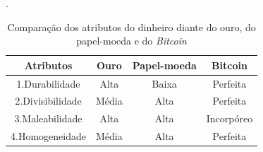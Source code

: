 \FloatBarrier
\begin{table}[h]
    \centering
	\caption{Comparação dos atributos do dinheiro diante do ouro, do papel-moeda e do \textit{Bitcoin}}.
	\begin{tabular}{|c|c|c|c|}
        
		\hline
		\rowcolor[HTML]{C0C0C0}
		\textbf{Atributos}                                                                & \textbf{Ouro}                                                     & \textbf{Papel-moeda}                                                              & \textbf{Bitcoin}                                                    \\ \hline
		1.Durabilidade                                                                    & Alta                                                              & Baixa                                                                             & Perfeita                                                            \\ \hline
		2.Divisibilidade                                                                  & Média                                                             & Alta                                                                              & Perfeita                                                            \\ \hline
		3.Maleabilidade                                                                   & Alta                                                              & Alta                                                                              & Incorpóreo                                                          \\ \hline
		4.Homogeneidade                                                                   & Média                                                             & Alta                                                                              & Perfeita                                                            \\ \hline

\end{tabular}
\end{table}
